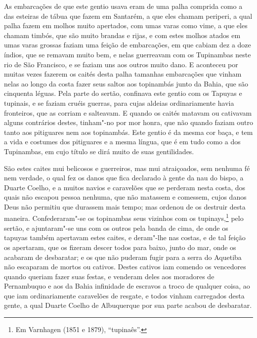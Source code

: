 As embarcações de que este gentio usava eram de uma palha comprida como a das esteiras de
tábua que fazem em Santarém, a que eles chamam periperi, a qual palha fazem em molhos
muito apertados, com umas varas como vime, a que eles chamam timbós, que são muito brandas
e rijas, e com estes molhos atados em umas varas grossas faziam uma feição de embarcações,
em que cabiam dez a doze índios, que se remavam muito bem, e nelas guerreavam com os
Tupinambas neste rio de São Francisco, e se faziam uns aos outros muito dano. E aconteceu
por muitas vezes fazerem os caités desta palha tamanhas embarcações que vinham nelas ao
longo da costa fazer seus saltos aos topinambás junto da Bahia, que são cinquenta léguas.
Pela parte do sertão, confinava este gentio com os Tapuyas e tupinais, e se faziam cruéis
guerras, para cujas aldeias ordinariamente havia fronteiros, que as corriam e salteavam. E
quando os caités matavam ou cativavam alguns contrários destes, tinham"-no por mor honra,
que não quando faziam outro tanto aos pitiguares nem aos topinambás. Este gentio é da
mesma cor baça, e tem a vida e costumes dos pitiguares e a mesma língua, que é em tudo
como a dos Tupinambas, em cujo título se dirá muito de suas gentilidades.

São estes caites mui belicosos e guerreiros, mas mui atraiçoados, sem nenhuma fé nem
verdade, o qual fez os danos que fica declarado à gente da nau do bispo, a Duarte Coelho,
e a muitos navios e caravelões que se perderam nesta costa, dos quais não escapou pessoa
nenhuma, que não matassem e comessem, cujos danos Deus não permitiu que durassem mais
tempo; mas ordenou de os destruir desta maneira. Confederaram"-se os topinambas seus
vizinhos com os tupinays,\footnote{ Em Varnhagen (1851 e 1879), ``tupinaês''.} pelo
sertão, e ajuntaram"-se uns com os outros pela banda de cima, de onde os tapuyas também
apertavam estes caites, e deram"-lhe nas costas, e de tal feição os apertaram, que os
fizeram descer todos para baixo, junto do mar, onde os acabaram de desbaratar; e os que
não puderam fugir para a serra do Aquetiba não escaparam de mortos ou cativos. Destes
cativos iam comendo os vencedores quando queriam fazer suas festas, e venderam deles aos
moradores de Pernambuquo e aos da Bahia infinidade de escravos a troco de qualquer coisa,
ao que iam ordinariamente caravelões de resgate, e todos vinham carregados desta gente, a
qual Duarte Coelho de Albuquerque por sua parte acabou de desbaratar.


